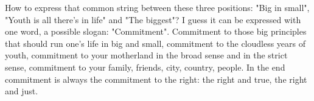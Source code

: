How to express that common string between these three positions: "Big in small", "Youth is all there's in life" and "The biggest"? I guess it can be expressed with one word, a possible slogan: "Commitment". Commitment to those big principles that should run one's life in big and small, commitment to the cloudless years of youth, commitment to your motherland in the broad sense and in the strict sense, commitment to your family, friends, city, country, people. In the end commitment is always the commitment to the right: the right and true, the right and just.

